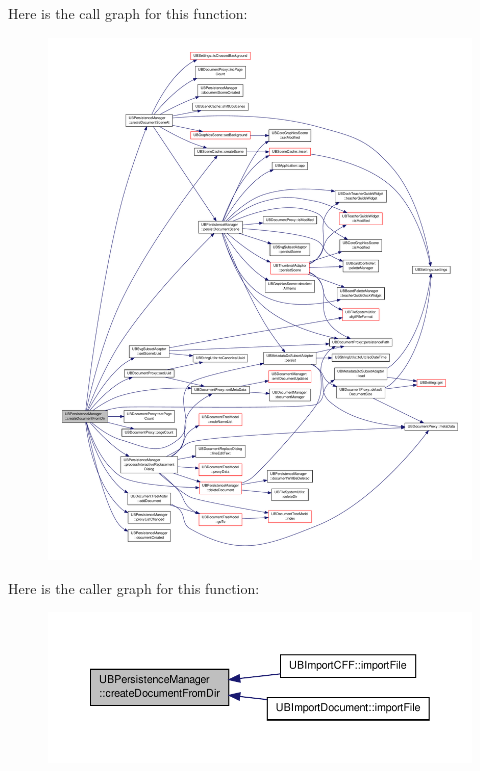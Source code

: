 Here is the call graph for this function\-:
\nopagebreak
\begin{figure}[H]
\begin{center}
\leavevmode
\includegraphics[width=350pt]{d0/dd5/class_u_b_persistence_manager_ac815cff8d53be5e6bb870aa4e83319f7_cgraph}
\end{center}
\end{figure}




Here is the caller graph for this function\-:
\nopagebreak
\begin{figure}[H]
\begin{center}
\leavevmode
\includegraphics[width=350pt]{d0/dd5/class_u_b_persistence_manager_ac815cff8d53be5e6bb870aa4e83319f7_icgraph}
\end{center}
\end{figure}


